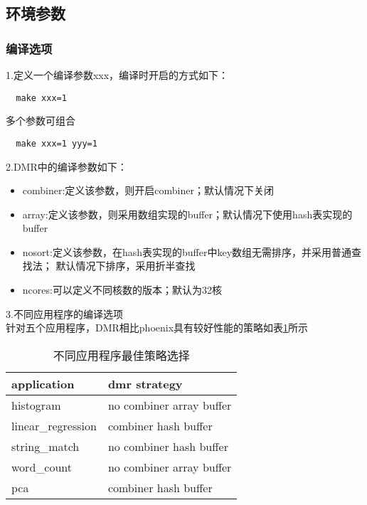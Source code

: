 \subsection{环境参数}
\subsubsection{编译选项}
1.定义一个编译参数xxx，编译时开启的方式如下：
\begin{lstlisting}
  make xxx=1
\end{lstlisting}
多个参数可组合
\begin{lstlisting}
  make xxx=1 yyy=1
\end{lstlisting}

2.DMR中的编译参数如下：
\begin{itemize}
  \item combiner:定义该参数，则开启combiner；默认情况下关闭 
  \item array:定义该参数，则采用数组实现的buffer；默认情况下使用hash表实现的buffer
  \item nosort:定义该参数，在hash表实现的buffer中key数组无需排序，并采用普通查找法；
  默认情况下排序，采用折半查找
  \item ncores:可以定义不同核数的版本；默认为32核
\end{itemize}


3.不同应用程序的编译选项\\
针对五个应用程序，DMR相比phoenix具有较好性能的策略如表\ref{dmr_strategy}所示
\begin{table}[htbp]
\caption{不同应用程序最佳策略选择}
\label{dmr_strategy}
\begin{tabular}{|l|l|}
\hline
application & dmr strategy\\
\hline
histogram & no combiner array buffer\\
\hline
linear\_regression & combiner hash buffer\\
\hline
string\_match & no combiner hash buffer\\               
\hline
word\_count & no combiner array buffer\\
\hline
pca & combiner hash buffer \\
\hline
\end{tabular}
\end{table}


